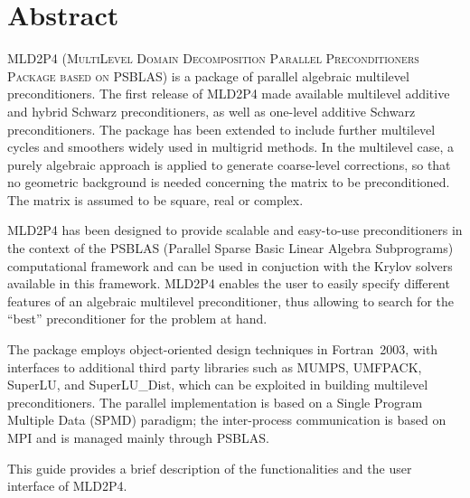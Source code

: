 \section*{Abstract}
\textsc{MLD2P4 (MultiLevel Domain Decomposition Parallel Preconditioners Package
based on PSBLAS}) is a package of parallel algebraic multilevel preconditioners.
The first release of MLD2P4 made available multilevel additive and hybrid Schwarz
preconditioners, as well as one-level additive Schwarz preconditioners. The package
has been extended to include further multilevel cycles and smoothers widely used in
multigrid methods. In the multilevel case, a purely algebraic approach is applied to
generate coarse-level corrections, so that no geometric background is needed
concerning the matrix to be preconditioned. The matrix is assumed to be square,
real or complex. 

MLD2P4 has been designed to provide scalable and easy-to-use preconditioners
in the context of the PSBLAS (Parallel Sparse Basic Linear Algebra Subprograms)
computational framework and can be used in conjuction with the Krylov solvers
available in this framework. MLD2P4 enables the user to easily specify different
features of an algebraic multilevel preconditioner, thus allowing to search
for the ``best'' preconditioner for the problem at hand. 

The package employs object-oriented design techniques in
Fortran~2003, with interfaces to additional third party libraries 
such as MUMPS, UMFPACK, SuperLU, and SuperLU\_Dist, which
can be exploited in building multilevel preconditioners. The parallel
implementation is based on a Single Program Multiple Data (SPMD)
paradigm; the inter-process communication is based on MPI and
is managed mainly through PSBLAS.

This guide provides a brief description of the functionalities and
the user interface of MLD2P4.
